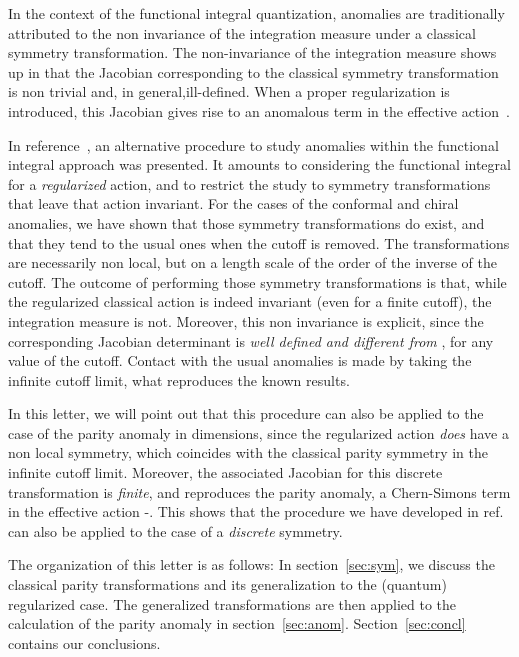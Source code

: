 \documentclass[a4paper,12pt]{article}
\begin{document}
In the context of the functional integral quantization, anomalies are
traditionally attributed to the non invariance of the integration
measure under a classical symmetry transformation. The non-invariance
of the integration measure shows up in that the Jacobian corresponding
to the classical symmetry transformation is non trivial and, in 
general,ill-defined. When a proper regularization is introduced,
this Jacobian gives rise to an anomalous term
in the effective action~\cite{Fujikawa}.

In reference~\cite{fm}, an alternative procedure to study anomalies
within the functional integral approach was presented. It amounts to
considering the functional integral for a {\em regularized\/}
action, and to restrict the study to symmetry transformations that
leave that action invariant.  For the cases of the conformal and
chiral anomalies, we have shown that those symmetry transformations do
exist, and that they tend to the usual ones when the cutoff is
removed. The transformations are necessarily non local, but on a
length scale of the order of the inverse of the cutoff.  The outcome
of performing those symmetry transformations is that, while the
regularized classical action is indeed invariant (even for a finite
cutoff), the integration measure is not. Moreover, this non invariance
is explicit, since the corresponding Jacobian determinant is {\em well
  defined and different from \coordHE{}}, for any value of the cutoff.
Contact with the usual anomalies is made by taking the infinite cutoff
limit, what reproduces the known results.

In this letter, we will point out that this procedure can also be
applied to the case of the parity anomaly in \coordHE{} dimensions, since
the regularized action {\it does\/} have a non local symmetry, which
coincides with the classical parity symmetry in the infinite cutoff limit.
Moreover, the associated Jacobian for this discrete transformation is
{\em finite}, and reproduces the parity anomaly, a Chern-Simons term in the
effective action
\cite{DeserJT}-\cite{RedlichL}. 
This shows that the procedure we have developed in
ref.~\cite{fm} can also be applied to the case of a {\em discrete\/}
symmetry.

The organization of this letter is as follows: In
section~\ref{sec:sym}, we discuss the classical parity transformations
and its generalization to the (quantum) regularized case. The
generalized transformations are then applied to the calculation of the
parity anomaly in section~\ref{sec:anom}.  Section~\ref{sec:concl}
contains our conclusions.
\end{document}

